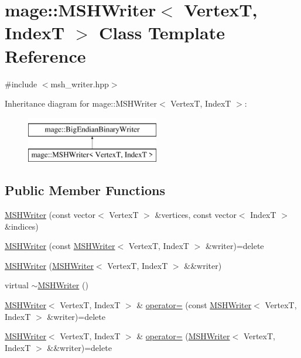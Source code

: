 \hypertarget{classmage_1_1_m_s_h_writer}{}\section{mage\+:\+:M\+S\+H\+Writer$<$ VertexT, IndexT $>$ Class Template Reference}
\label{classmage_1_1_m_s_h_writer}


{\ttfamily \#include $<$msh\+\_\+writer.\+hpp$>$}

Inheritance diagram for mage\+:\+:M\+S\+H\+Writer$<$ VertexT, IndexT $>$\+:\begin{figure}[H]
\begin{center}
\leavevmode
\includegraphics[height=2.000000cm]{classmage_1_1_m_s_h_writer}
\end{center}
\end{figure}
\subsection*{Public Member Functions}
\begin{DoxyCompactItemize}
\item 
\hyperlink{classmage_1_1_m_s_h_writer_a4b74333888706ab61c9d6c3b6fefd4c5}{M\+S\+H\+Writer} (const vector$<$ VertexT $>$ \&vertices, const vector$<$ IndexT $>$ \&indices)
\item 
\hyperlink{classmage_1_1_m_s_h_writer_a2d806cd90f75130775a29ccc5a2f92be}{M\+S\+H\+Writer} (const \hyperlink{classmage_1_1_m_s_h_writer}{M\+S\+H\+Writer}$<$ VertexT, IndexT $>$ \&writer)=delete
\item 
\hyperlink{classmage_1_1_m_s_h_writer_a69988e7b0eea3b4e9053455955acaec5}{M\+S\+H\+Writer} (\hyperlink{classmage_1_1_m_s_h_writer}{M\+S\+H\+Writer}$<$ VertexT, IndexT $>$ \&\&writer)
\item 
virtual \hyperlink{classmage_1_1_m_s_h_writer_a75e57bab20c8928b230305118bf9aa5f}{$\sim$\+M\+S\+H\+Writer} ()
\item 
\hyperlink{classmage_1_1_m_s_h_writer}{M\+S\+H\+Writer}$<$ VertexT, IndexT $>$ \& \hyperlink{classmage_1_1_m_s_h_writer_a2c44587daf98ba5565ac883878b61c9e}{operator=} (const \hyperlink{classmage_1_1_m_s_h_writer}{M\+S\+H\+Writer}$<$ VertexT, IndexT $>$ \&writer)=delete
\item 
\hyperlink{classmage_1_1_m_s_h_writer}{M\+S\+H\+Writer}$<$ VertexT, IndexT $>$ \& \hyperlink{classmage_1_1_m_s_h_writer_ae1fddfee32bfcf1e6b9f031749cdbbcb}{operator=} (\hyperlink{classmage_1_1_m_s_h_writer}{M\+S\+H\+Writer}$<$ VertexT, IndexT $>$ \&\&writer)=delete
\end{DoxyCompactItemize}
